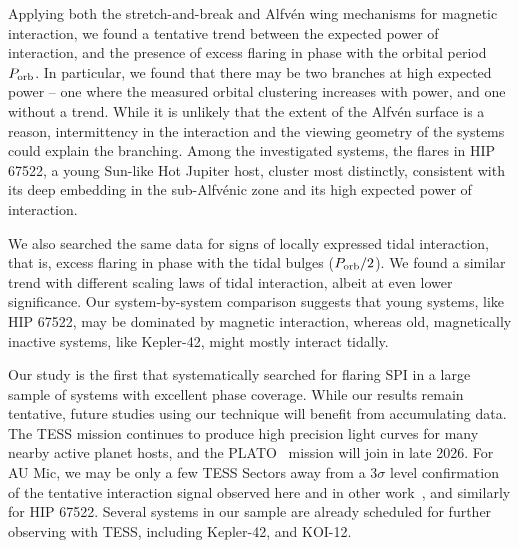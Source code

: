 \documentclass[twocolumn]{aastex631}
\begin{document}
Applying both the stretch-and-break and Alfv\'en wing mechanisms for magnetic interaction, we found a tentative trend between the expected power of interaction, and the presence of excess flaring in phase with the orbital period $P_{\rm orb}$. In particular, we found that there may be two branches at high expected power -- one where the measured orbital clustering increases with power, and one without a trend. While it is unlikely that the extent of the Alfv\'en surface is a reason, intermittency in the interaction and the viewing geometry of the systems could explain the branching. Among the investigated systems, the flares in HIP 67522, a young Sun-like Hot Jupiter host, cluster most distinctly, consistent with its deep embedding in the sub-Alfv\'enic zone and its high expected power of interaction.

We also searched the same data for signs of locally expressed tidal interaction, that is, excess flaring in phase with the tidal bulges ($P_{\rm orb}/2$). We found a similar trend with different scaling laws of tidal interaction, albeit at even lower significance. Our system-by-system comparison suggests that young systems, like HIP 67522, may be dominated by magnetic interaction, whereas old, magnetically inactive systems, like Kepler-42, might mostly interact tidally. 

Our study is the first that systematically searched for flaring SPI in a large sample of systems with excellent phase coverage. While our results remain tentative, future studies using our technique will benefit from accumulating data. The TESS mission continues to produce high precision light curves for many nearby active planet hosts, and the PLATO~\citep{rauer2014plato} mission will join in late 2026. For AU Mic, we may be only a few TESS Sectors away from a $3\sigma$ level confirmation~\citep{ilin2022searching} of the tentative interaction signal observed here and in other work~\citep{klein2022one}, and similarly for HIP 67522. Several systems in our sample are already scheduled for further observing with TESS, including Kepler-42, and KOI-12.

 

\end{document}
